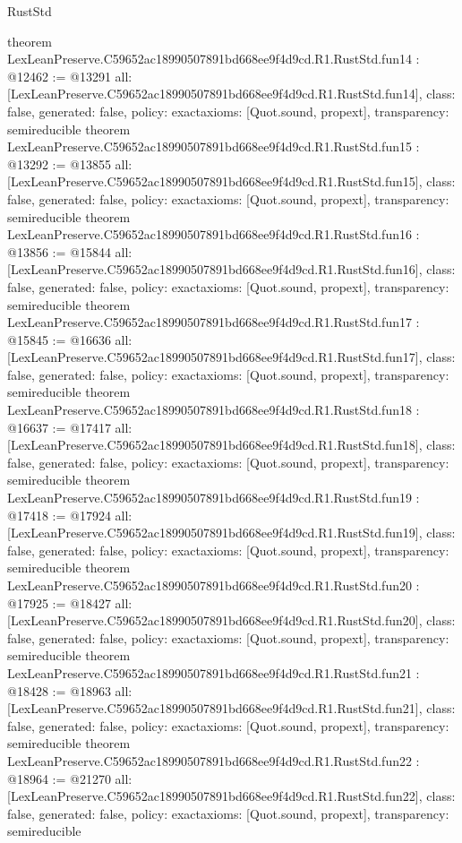 \begin{lexlean}{RustStd}
\begin{coremodule}
{}
theorem LexLeanPreserve.C59652ac18990507891bd668ee9f4d9cd.R1.RustStd.fun14 : @12462 := @13291 {
  all: [LexLeanPreserve.C59652ac18990507891bd668ee9f4d9cd.R1.RustStd.fun14],
  class: false,
  generated: false,
  policy: exact{axioms: [Quot.sound, propext]},
  transparency: semireducible
}
theorem LexLeanPreserve.C59652ac18990507891bd668ee9f4d9cd.R1.RustStd.fun15 : @13292 := @13855 {
  all: [LexLeanPreserve.C59652ac18990507891bd668ee9f4d9cd.R1.RustStd.fun15],
  class: false,
  generated: false,
  policy: exact{axioms: [Quot.sound, propext]},
  transparency: semireducible
}
theorem LexLeanPreserve.C59652ac18990507891bd668ee9f4d9cd.R1.RustStd.fun16 : @13856 := @15844 {
  all: [LexLeanPreserve.C59652ac18990507891bd668ee9f4d9cd.R1.RustStd.fun16],
  class: false,
  generated: false,
  policy: exact{axioms: [Quot.sound, propext]},
  transparency: semireducible
}
theorem LexLeanPreserve.C59652ac18990507891bd668ee9f4d9cd.R1.RustStd.fun17 : @15845 := @16636 {
  all: [LexLeanPreserve.C59652ac18990507891bd668ee9f4d9cd.R1.RustStd.fun17],
  class: false,
  generated: false,
  policy: exact{axioms: [Quot.sound, propext]},
  transparency: semireducible
}
theorem LexLeanPreserve.C59652ac18990507891bd668ee9f4d9cd.R1.RustStd.fun18 : @16637 := @17417 {
  all: [LexLeanPreserve.C59652ac18990507891bd668ee9f4d9cd.R1.RustStd.fun18],
  class: false,
  generated: false,
  policy: exact{axioms: [Quot.sound, propext]},
  transparency: semireducible
}
theorem LexLeanPreserve.C59652ac18990507891bd668ee9f4d9cd.R1.RustStd.fun19 : @17418 := @17924 {
  all: [LexLeanPreserve.C59652ac18990507891bd668ee9f4d9cd.R1.RustStd.fun19],
  class: false,
  generated: false,
  policy: exact{axioms: [Quot.sound, propext]},
  transparency: semireducible
}
theorem LexLeanPreserve.C59652ac18990507891bd668ee9f4d9cd.R1.RustStd.fun20 : @17925 := @18427 {
  all: [LexLeanPreserve.C59652ac18990507891bd668ee9f4d9cd.R1.RustStd.fun20],
  class: false,
  generated: false,
  policy: exact{axioms: [Quot.sound, propext]},
  transparency: semireducible
}
theorem LexLeanPreserve.C59652ac18990507891bd668ee9f4d9cd.R1.RustStd.fun21 : @18428 := @18963 {
  all: [LexLeanPreserve.C59652ac18990507891bd668ee9f4d9cd.R1.RustStd.fun21],
  class: false,
  generated: false,
  policy: exact{axioms: [Quot.sound, propext]},
  transparency: semireducible
}
theorem LexLeanPreserve.C59652ac18990507891bd668ee9f4d9cd.R1.RustStd.fun22 : @18964 := @21270 {
  all: [LexLeanPreserve.C59652ac18990507891bd668ee9f4d9cd.R1.RustStd.fun22],
  class: false,
  generated: false,
  policy: exact{axioms: [Quot.sound, propext]},
  transparency: semireducible
}
\end{coremodule}
\end{lexlean}
